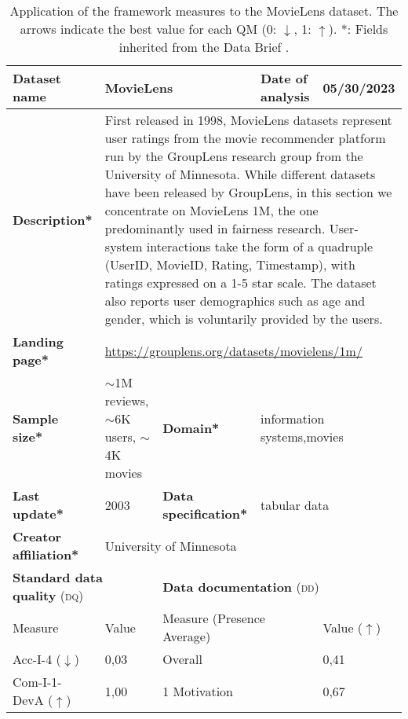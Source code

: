 \begin{table}[h]
    \caption{Application of the framework measures to the MovieLens dataset. The arrows indicate the best value for each QM (0: $\downarrow$, 1: $\uparrow$). *: Fields inherited from the Data Brief \cite{fabrisAlgorithmicFairnessDatasets2022}.}
    \label{tab:MovieLens}
    \begin{tabular}{|p{3cm}|p{1.9cm}p{3cm}p{2.6cm}p{1.6cm}|}
        \hline
        \textbf{Dataset name} & \multicolumn{2}{l|}{MovieLens} & \multicolumn{1}{l|}{\textbf{Date of analysis}} & 05/30/2023 \\ \hline
        \textbf{Description*} & \multicolumn{4}{p{10cm}|}{First released in 1998, MovieLens datasets represent user ratings from the movie recommender platform run by the GroupLens research group from the University of Minnesota. While different datasets have been released by GroupLens, in this section we concentrate on MovieLens 1M, the one predominantly used in fairness research. User-system interactions take the form of a quadruple (UserID, MovieID, Rating, Timestamp), with ratings expressed on a 1-5 star scale. The dataset also reports user demographics such as age and gender, which is voluntarily provided by the users.} \\ \hline
        \textbf{Landing page*} & \multicolumn{4}{l|}{\href{https://grouplens.org/datasets/movielens/1m/}{https://grouplens.org/datasets/movielens/1m/}} \\ \hline
        \textbf{Sample size*} & $\sim$1M reviews, $\sim$6K users, $\sim$4K movies & \multicolumn{1}{|l}{\textbf{Domain*}} & \multicolumn{2}{|l|}{information systems,movies}  \\ \hline
        \textbf{Last update*} & 2003 & \multicolumn{1}{|p{3cm}}{\textbf{Data specification*}} & \multicolumn{2}{|l|}{tabular data} \\ \hline
        \textbf{Creator affiliation*} & \multicolumn{4}{l|}{University of Minnesota} \\ \hline\hline
        \multicolumn{2}{|l|}{\textbf{Standard data quality} (\textsc{dq})} & \multicolumn{3}{|l|}{\textbf{Data documentation} (\textsc{dd})}\\ \hline
        Measure & Value & \multicolumn{2}{|l|}{Measure (Presence Average)} & Value ($\uparrow$) \\ \hline
        Acc-I-4 ($\downarrow$) & 0,03\cellcolor[HTML]{FEFCFB} & \multicolumn{2}{|l|}{Overall} & 0,41\cellcolor[HTML]{FDBEAB} \\
        Com-I-1-DevA ($\uparrow$) & 1,00\cellcolor[HTML]{FFFFFF} & \multicolumn{2}{|l|}{1 Motivation} & 0,67\cellcolor[HTML]{FEDAD0} \\

\end{tabular}
\end{table}
